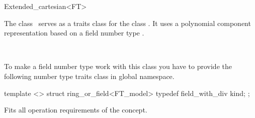 
\ccAutoIndexingOff
\begin{ccRefClass}{Extended_cartesian<FT>}
\ccAutoIndexingOn
{}

\ccDefinition
  
The class \ccRefName\ serves as a traits class for the class
.  It uses a polynomial component
representation based on a field number type .


\ccIsModel

%
 \\

\ccCreation
{}  %



To make a field number type  work with this class you
have to provide the following number type traits class in global
namespace.

\begin{ccExampleCode}
template <>
struct ring_or_field<FT_model> {
  typedef field_with_div kind;
};    
\end{ccExampleCode}

\ccOperations

Fits all operation requirements of the concept.

\ccSeeAlso

 \\


\ccIndexTraitsClassEnd
\ccAutoIndexingOff
\end{ccRefClass}
\ccAutoIndexingOn

